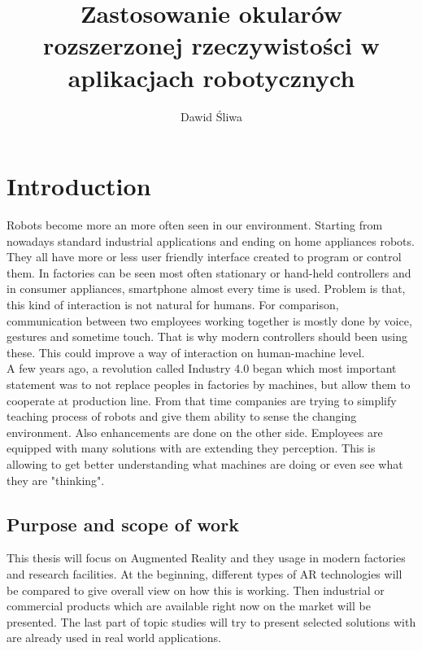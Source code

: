 \documentclass[printmode,en]{mgr}
\title{Zastosowanie okularów rozszerzonej rzeczywistości w aplikacjach
robotycznych}
\author{Dawid Śliwa}
\begin{document}

\maketitle %


\tableofcontents %

\chapter{Introduction}
Robots become more an more often seen in our environment. Starting from nowadays standard industrial applications and ending on home appliances robots. They all have more or less user friendly interface created to program or control them. In factories can be seen most often stationary or hand-held controllers and in consumer appliances, smartphone almost every time is used. Problem is that, this kind of interaction is not natural for humans. For comparison, communication between two employees working together is mostly done by voice, gestures and sometime touch. That is why modern controllers should been using these. This could improve a way of interaction on human-machine level. \\

A few years ago, a revolution called Industry 4.0 began which most important statement was to not replace peoples in factories by machines, but allow them to cooperate at production line. From that time companies are trying to simplify teaching process of robots and give them ability to sense the changing environment. Also enhancements are done on the other side. Employees are equipped with many solutions with are extending they perception. This is allowing to get better understanding what machines are doing or even see what they are "thinking".

\section{Purpose and scope of work}
This thesis will focus on Augmented Reality and they usage in modern factories and research facilities. At the beginning, different types of AR technologies will be compared to give overall view on how this is working. Then industrial or commercial products which are available right now on the market will be presented. The last part of topic studies will try to present selected solutions with are already used in real world applications.\\
\end{document}
